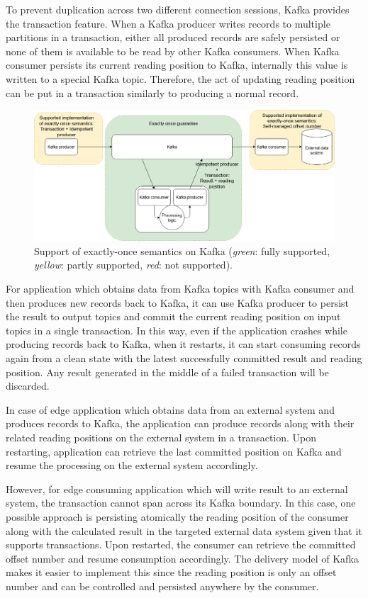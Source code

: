 To prevent duplication across two different connection sessions, Kafka provides the transaction feature. When a Kafka producer writes records to multiple partitions in a transaction, either all produced records are safely persisted or none of them is available to be read by other Kafka consumers. When Kafka consumer persists its current reading position to Kafka, internally this value is written to a special Kafka topic. Therefore, the act of updating reading position can be put in a transaction similarly to producing a normal record.

\begin{figure}[h]
	\centering
	\includegraphics[width=\linewidth]{images/exactly-once-kafka.png}
	\caption{Support of exactly-once semantics on Kafka (\emph{green}: fully supported, \emph{yellow}: partly supported, \emph{red}: not supported).}
	\label{fig:exactlyoncekafka}
\end{figure}


For application which obtains data from Kafka topics with Kafka consumer and then produces new records back to Kafka, it can use Kafka producer to persist the result to output topics and commit the current reading position on input topics in a single transaction. In this way, even if the application crashes while producing records back to Kafka, when it restarts, it can start consuming records again from a clean state with the latest successfully committed result and reading position. Any result generated in the middle of a failed transaction will be discarded. 

In case of edge application which obtains data from an external system and produces records to Kafka, the application can produce records along with their related reading positions on the external system in a transaction. Upon restarting, application can retrieve the last committed position on Kafka and resume the processing on the external system accordingly. 

However, for edge consuming application which will write result to an external system, the transaction cannot span across its Kafka boundary. In this case, one possible approach is persisting atomically the reading position of the consumer along with the calculated result in the targeted external data system given that it supports transactions. Upon restarted, the consumer can retrieve the committed offset number and resume consumption accordingly. The delivery model of Kafka makes it easier to implement this since the reading position is only an offset number and can be controlled and persisted anywhere by the consumer.


